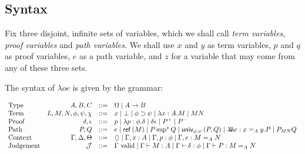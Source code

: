 
\subsection{Syntax}

Fix three disjoint, infinite sets of variables, which we shall call \emph{term variables}, \emph{proof variables}
and \emph{path variables}.  We shall use $x$ and $y$ as term variables, $p$ and $q$ as proof variables,
$e$ as a path variable, and $z$ for a variable that may come from any of these three sets.

The syntax of $\lambda o e$ is given by the grammar:

\[
\begin{array}{lrcl}
\text{Type} & A,B,C & ::= & \Omega \mid A \rightarrow B \\
\text{Term} & L,M,N, \phi,\psi,\chi & ::= & x \mid \bot \mid \phi \supset \psi \mid \lambda x:A.M \mid MN \\
\text{Proof} & \delta, \epsilon & ::= & p \mid \lambda p:\phi.\delta \mid \delta \epsilon \mid P^+ \mid P^- \\
\text{Path} & P, Q & ::= & e \mid \mathsf{ref} \left( {M} \right) \mid P \sup^* Q \mid \mathsf{univ}_{{\phi} , {\psi}} \left( {P} , {Q} \right) \mid \lambda \!\! \lambda \!\! \lambda e : x =_A y. P \mid P_{MN} Q \\
\text{Context} & \Gamma, \Delta, \Theta & ::= & \langle \rangle \mid \Gamma, x : A \mid \Gamma, p : \phi \mid \Gamma, e : M =_A N \\
\text{Judgement} & \mathcal{J} & ::= & \Gamma \ \mathrm{valid} \mid \Gamma \vdash M : A \mid \Gamma \vdash \delta : \phi \mid \Gamma \vdash P : M =_A N
\end{array}
\]


